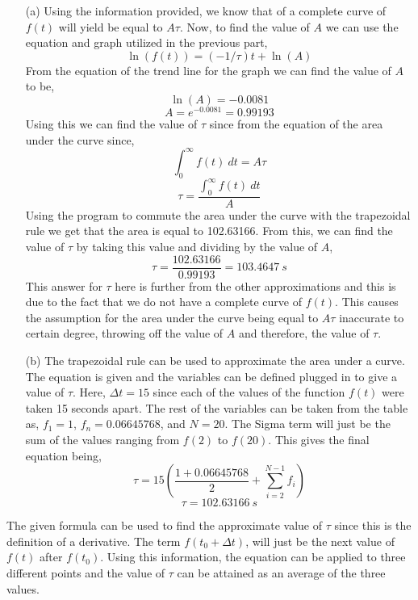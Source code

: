 \documentclass[12pt]{article}
\begin{document}
    \begin{itemize}
        \item[(a)]
            Using the information provided, we know that of a complete curve of $ f(t) $ will yield be equal to $ A\tau $. Now, to find the value of $ A $ we can use the equation and graph utilized in the previous part,
            \[
                \ln(f(t)) = (-1 / \tau)t + \ln(A)
            \]
            From the equation of the trend line for the graph we can find the value of $ A $ to be,
            \[
                \ln(A) = -0.0081
            \]
            \[
                A = e^{-0.0081} = 0.99193
            \]
            Using this we can find the value of $ \tau $ since from the equation of the area under the curve since,
            \[
                \int_0^\infty f(t)\ dt = A \tau
            \]
            \[
                \tau = \frac{\int_0^\infty f(t)\ dt }{A}
            \]
            Using the program to commute the area under the curve with the trapezoidal rule we get that the area is equal to 102.63166. From this, we can find the value of $ \tau $ by taking this value and dividing by the value of $ A $,
            \[
                \tau = \frac{102.63166}{0.99193} = \boxed{103.4647\ s}
            \]
            This answer for $ \tau $ here is further from the other approximations and this is due to the fact that we do not have a complete curve of $ f(t) $. This causes the assumption for the area under the curve being equal to $ A\tau $ inaccurate to certain degree, throwing off the value of $ A $ and therefore, the value of $ \tau $.
        \item[(b)]
            The trapezoidal rule can be used to approximate the area under a curve. The equation is given and the variables can be defined plugged in to give a value of $ \tau $. Here, $ \Delta t = 15$ since each of the values of the function $ f(t) $ were taken 15 seconds apart. The rest of the variables can be taken from the table as, $ f_1 = 1 $, $ f_{n} = 0.06645768 $, and $ N = 20 $. The Sigma term will just be the sum of the values ranging from $ f(2) $ to $ f(20) $.  This gives the final equation being,
            \[
                \tau = 15 \left( \frac{1+0.06645768}{2} + \sum_{i=2}^{N-1} f_{i} \right)
            \]
            \[
                \tau = \boxed{102.63166\ s}
            \]
    \end{itemize}
    \par The given formula can be used to find the approximate value of $ \tau $ since this is the definition of a derivative. The term $ f(t_0 + \Delta t) $, will just be the next value of $ f(t) $ after $ f(t_0) $. Using this information, the equation can be applied to three different points and the value of $ \tau $ can be attained as an average of the three values.
\end{document}
